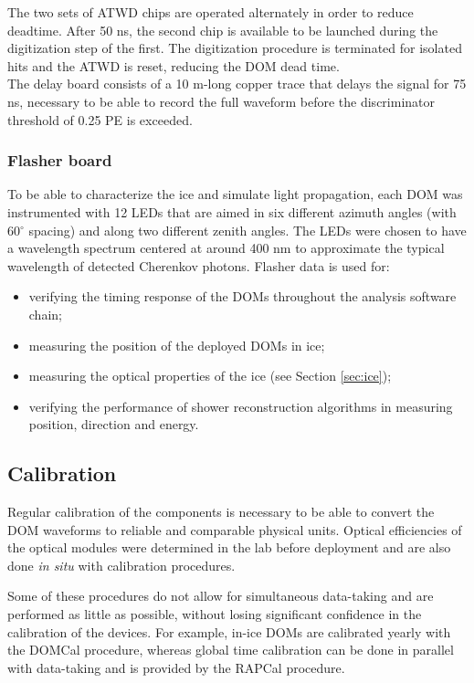 The two sets of ATWD chips are operated alternately in order to reduce deadtime. After 50 ns, the second chip is available to be launched during the digitization step of the first. The digitization procedure is terminated for isolated hits and the ATWD is reset, reducing the DOM dead time.\\

\noindent The delay board consists of a 10 m-long copper trace that delays the signal for 75 ns, necessary to be able to record the full waveform before the discriminator threshold of 0.25 PE is exceeded.

\subsubsection{Flasher board}
\label{subsub:flasher}
To be able to characterize the ice and simulate light propagation, each DOM was instrumented with 12 LEDs that are aimed in six different azimuth angles (with 60$^\circ$ spacing) and along two different zenith angles. The LEDs were chosen to have a wavelength spectrum centered at around 400 nm to approximate the typical wavelength of detected Cherenkov photons. Flasher data is used for:
\vspace{2mm}
\begin{itemize}
\item verifying the timing response of the DOMs throughout the analysis software chain;
\item measuring the position of the deployed DOMs in ice;
\item measuring the optical properties of the ice (see Section \ref{sec:ice});
\item verifying the performance of shower reconstruction algorithms in measuring position, direction and energy.
\end{itemize}



\subsection{Calibration}
\label{subsec:calibration}
Regular calibration of the components is necessary to be able to convert the DOM waveforms to reliable and comparable physical units. Optical efficiencies of the optical modules were determined in the lab before deployment and are also done \textit{in situ} with calibration procedures.

Some of these procedures do not allow for simultaneous data-taking and are performed as little as possible, without losing significant confidence in the calibration of the devices. For example, in-ice DOMs are calibrated yearly with the DOMCal procedure, whereas global time calibration can be done in parallel with data-taking and is provided by the RAPCal procedure.

